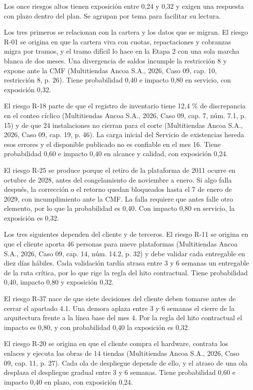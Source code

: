 \documentclass[11pt]{article}
\begin{document}
Los once riesgos altos tienen exposición entre 0,24 y 0,32 y exigen una respuesta con plazo dentro del plan. Se agrupan por tema para facilitar su lectura.

Los tres primeros se relacionan con la cartera y los datos que se migran. El riesgo R-01 se origina en que la cartera viva con cuotas, repactaciones y cobranzas migra por tramos, y el tramo difícil lo hace en la Etapa 2 con una sola marcha blanca de dos meses. Una divergencia de saldos incumple la restricción 8 y expone ante la CMF (Multitiendas Ancoa S.A., 2026, Caso 09, cap. 10, restricción 8, p. 26). Tiene probabilidad 0,40 e impacto 0,80 en servicio, con exposición 0,32.

El riesgo R-18 parte de que el registro de inventario tiene 12,4 \% de discrepancia en el conteo cíclico (Multitiendas Ancoa S.A., 2026, Caso 09, cap. 7, núm. 7.1, p. 15) y de que 24 instalaciones no cierran para el corte (Multitiendas Ancoa S.A., 2026, Caso 09, cap. 19, p. 46). La carga inicial del Servicio de existencias hereda esos errores y el disponible publicado no es confiable en el mes 16. Tiene probabilidad 0,60 e impacto 0,40 en alcance y calidad, con exposición 0,24.

El riesgo R-25 se produce porque el retiro de la plataforma de 2011 ocurre en octubre de 2028, antes del congelamiento de noviembre a enero. Si algo falla después, la corrección o el retorno quedan bloqueados hasta el 7 de enero de 2029, con incumplimiento ante la CMF. La falla requiere que antes falle otro elemento, por lo que la probabilidad es 0,40. Con impacto 0,80 en servicio, la exposición es 0,32.

Los tres siguientes dependen del cliente y de terceros. El riesgo R-11 se origina en que el cliente aporta 46 personas para nueve plataformas (Multitiendas Ancoa S.A., 2026, Caso 09, cap. 14, núm. 14.2, p. 32) y debe validar cada entregable en diez días hábiles. Cada validación tardía atrasa entre 3 y 6 semanas un entregable de la ruta crítica, por lo que rige la regla del hito contractual. Tiene probabilidad 0,40, impacto 0,80 y exposición 0,32.

El riesgo R-37 nace de que siete decisiones del cliente deben tomarse antes de cerrar el apartado 4.1. Una demora aplaza entre 3 y 6 semanas el cierre de la arquitectura frente a la línea base del mes 4. Por la regla del hito contractual el impacto es 0,80, y con probabilidad 0,40 la exposición es 0,32.

El riesgo R-20 se origina en que el cliente compra el hardware, contrata los enlaces y ejecuta las obras de 14 tiendas (Multitiendas Ancoa S.A., 2026, Caso 09, cap. 11, p. 27). Cada ola de despliegue depende de ello, y el atraso de una ola desplaza el despliegue gradual entre 3 y 6 semanas. Tiene probabilidad 0,60 e impacto 0,40 en plazo, con exposición 0,24.
\end{document}
